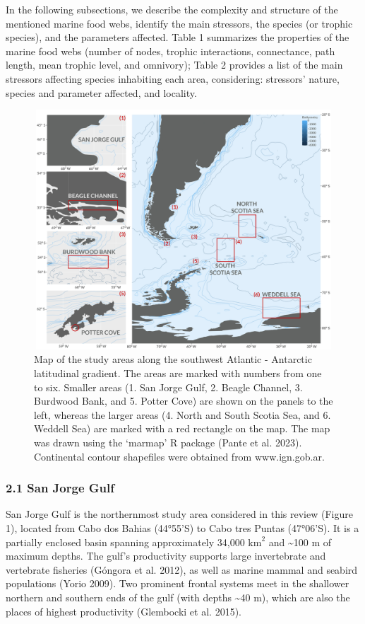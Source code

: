 \documentclass[
]{article}
\begin{document}
In the following subsections, we describe the complexity and structure
of the mentioned marine food webs, identify the main stressors, the
species (or trophic species), and the parameters affected. Table 1
summarizes the properties of the marine food webs (number of nodes,
trophic interactions, connectance, path length, mean trophic level, and
omnivory); Table 2 provides a list of the main stressors affecting
species inhabiting each area, considering: stressors' nature, species
and parameter affected, and locality.

\begin{figure}
\centering
\includegraphics[width=6.27in,height=3.528in]{Figures/Map_final.jpg}
\caption{Map of the study areas along the southwest Atlantic - Antarctic
latitudinal gradient. The areas are marked with numbers from one to six.
Smaller areas (1. San Jorge Gulf, 2. Beagle Channel, 3. Burdwood Bank,
and 5. Potter Cove) are shown on the panels to the left, whereas the
larger areas (4. North and South Scotia Sea, and 6. Weddell Sea) are
marked with a red rectangle on the map. The map was drawn using the
`marmap' R package (Pante et al. 2023). Continental contour shapefiles
were obtained from www.ign.gob.ar.}
\end{figure}

\subsubsection{2.1 San Jorge Gulf}\label{san-jorge-gulf}

San Jorge Gulf is the northernmost study area considered in this review
(Figure 1), located from Cabo dos Bahias (44°55'S) to Cabo tres Puntas
(47°06'S). It is a partially enclosed basin spanning approximately
34,000 \(\text{km}^2\) and \textasciitilde100 m of maximum depths. The
gulf's productivity supports large invertebrate and vertebrate fisheries
(Góngora et al. 2012), as well as marine mammal and seabird populations
(Yorio 2009). Two prominent frontal systems meet in the shallower
northern and southern ends of the gulf (with depths \textasciitilde40
m), which are also the places of highest productivity (Glembocki et al.
2015).
\end{document}
